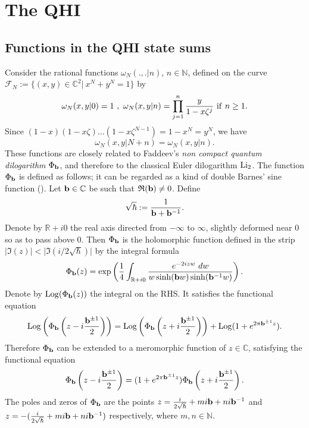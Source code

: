\documentclass[11pt]{amsart}
\newcommand{\mr}{\mathbb{R}}
\newcommand{\mc}{\mathbb{C}}
\newcommand{\mn}{\mathbb{N}}
\newcommand{\Log}{{\rm Log}}
\newcommand{\rmb}{{\rm \bf b}}
\begin{document}
{\section{The QHI} \label{sec:QHI}

 \subsection{Functions in the QHI state sums}\label{FUNCNOT}  Consider the rational functions $\omega_N(.,.|n)$, $n\in \mn$, defined on the curve $\mathcal{F}_N :=\{(x,y)\in \mc^2\vert \ x^N+y^N=1\}$ by
\begin{equation}\label{functomegadef}
\omega_N(x,y|0)=1\ ,\ \omega_N(x,y|n)=\prod_{j=1}^n \frac{y}{1-x\zeta^{j}}\ {\rm if} \ n\geq 1.
\end{equation}
Since $(1-x)(1-x\zeta)\ldots (1-x\zeta^{N-1}) = 1-x^N=y^N$, we have
$$\omega_N(x,y|N+n) = \omega_N(x,y|n).$$
These functions are closely related to Faddeev's \cite{Fad,FKV} {\it non compact quantum dilogarithm} $\Phi_\rmb$, and therefore to the classical Euler dilogarithm ${\rm Li_2}$. The function $\Phi_\rmb$ is defined as follows; it can be regarded as a kind of double Barnes' sine function (\cite{GR}). Let $\rmb\in \mc$ be such that $\mathfrak{R}(\rmb)\ne 0$. Define
$$\sqrt{\hbar} := \frac{1}{\rmb+\rmb^{-1}}.$$
Denote by $\mr +i0$ the real axis directed from $-\infty$ to $\infty$, slightly deformed near $0$ so as to pass above $0$. Then $\Phi_\rmb$ is the holomorphic function defined in the strip $\vert \mathfrak{I}(z)\vert < \vert \mathfrak{I}(i/2\sqrt{\hbar})\vert$ by the integral formula 
\begin{equation}\label{intrepS}
\Phi_{{\rmb}}(z) =\exp\left(\frac{1}{4} \int_{\mr +i0} \frac{e^{-2izw}\ dw}{w\sinh(\rmb w)\sinh(\rmb^{-1} w)}\right).
\end{equation}
Denote by $\Log(\Phi_{{\rmb}}(z))$ the integral on the RHS. It satisfies the functional equation
\begin{equation}\label{eqfuncphibLog}
\Log\left(\Phi_{{\rmb}}\left(z-i\frac{\rmb^{\pm 1}}{2}\right)\right) = \Log\left(\Phi_{{\rmb}}\left(z+i\frac{\rmb^{\pm 1}}{2}\right)\right) + \Log(1+e^{2\pi\rmb^{\pm 1}z}) .
\end{equation}
Therefore $\Phi_{{\rmb}}$ can be extended to a meromorphic function of $z\in \mc$, satisfying the functional equation
\begin{equation}\label{eqfuncphib}
\Phi_{{\rmb}}\left(z-i\frac{\rmb^{\pm 1}}{2}\right) = (1+e^{2\pi\rmb^{\pm 1}z}) \Phi_{{\rmb}}\left(z+i\frac{\rmb^{\pm 1}}{2}\right).
\end{equation}
The poles and zeros of $\Phi_\rmb$ are the points $\textstyle z=\frac{i}{2\sqrt{\hbar}} +mi\rmb+ni\rmb^{-1}$ and $\textstyle z=-(\frac{i}{2\sqrt{\hbar}}+mi\rmb+ni\rmb^{-1})$ respectively, where $m,n\in \mn$.

}
\end{document}
